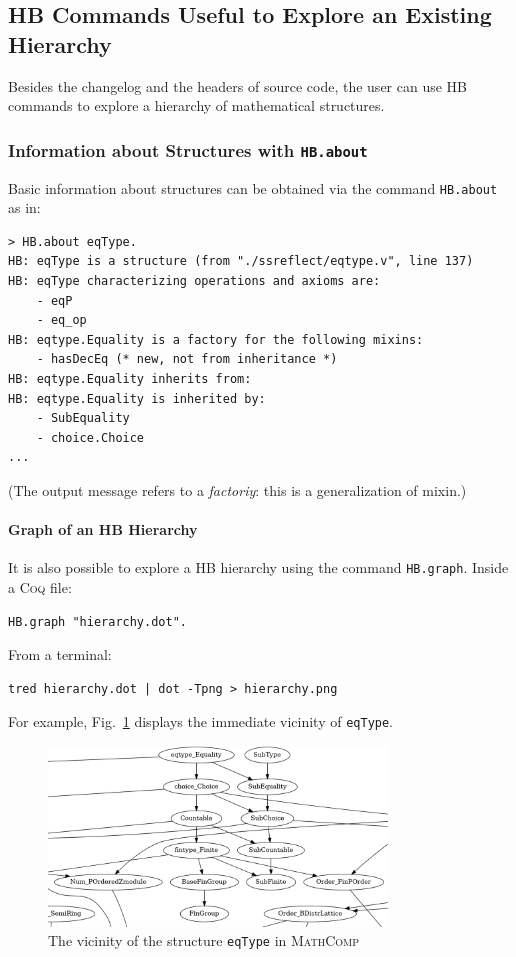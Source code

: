 \documentclass{article}
\def\coq{\textsc{Coq}}
\def\mathcomp{\textsc{MathComp}}
\def\hb{\textsc{HB}}
\def\coqin#1{\texttt{#1}}
\def\newterm#1{{\sl #1}}
\begin{document}
\subsection{\hb{} Commands Useful to Explore an Existing Hierarchy}

Besides the changelog and the headers of source code, the user can use
\hb{} commands to explore a hierarchy of mathematical structures.

\subsubsection{Information about Structures with \coqin{HB.about}}

Basic information about structures can be obtained via the command
\coqin{HB.about} as in:
\begin{verbatim}
> HB.about eqType.
HB: eqType is a structure (from "./ssreflect/eqtype.v", line 137)
HB: eqType characterizing operations and axioms are:
    - eqP
    - eq_op
HB: eqtype.Equality is a factory for the following mixins:
    - hasDecEq (* new, not from inheritance *)
HB: eqtype.Equality inherits from:
HB: eqtype.Equality is inherited by:
    - SubEquality
    - choice.Choice
...
\end{verbatim}
(The output message refers to a \newterm{factoriy}: this is a
generalization of mixin.)

\paragraph{Graph of an \hb{} Hierarchy}

It is also possible to explore a \hb{} hierarchy using the command
\coqin{HB.graph}. Inside a \coq{} file:
\begin{verbatim}
HB.graph "hierarchy.dot".
\end{verbatim}
From a terminal:
\begin{verbatim}
tred hierarchy.dot | dot -Tpng > hierarchy.png
\end{verbatim}
For example, Fig.~\ref{fig:eqtype_hier} displays the immediate
vicinity of \coqin{eqType}.

\begin{figure}[htbp]
\centering
\includegraphics[width=9cm]{eqtype_hier.png}
\caption{The vicinity of the structure {\tt eqType} in \mathcomp{}}
\label{fig:eqtype_hier}
\end{figure}
\end{document}
